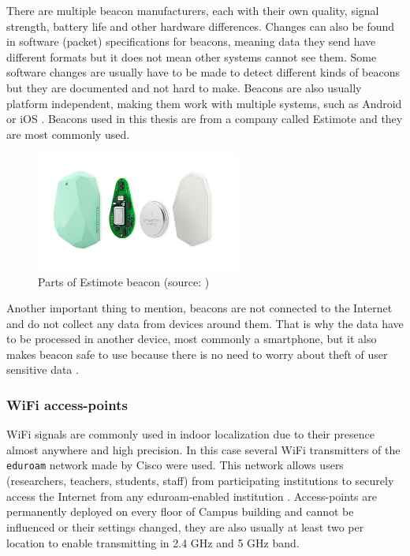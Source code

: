 There are multiple beacon manufacturers, each with their own quality, signal strength, battery life and other hardware differences. Changes can also be found in software (packet) specifications for beacons, meaning data they send have different formats but it does not mean other systems cannot see them. Some software changes are usually have to be made to detect different kinds of beacons but they are documented and not hard to make. Beacons are also usually platform independent, making them work with multiple systems, such as Android or iOS \cite{IPSBOBLE, 10TABB}. Beacons used in this thesis are from a company called Estimote and they are most commonly used.

\begin{figure}[H]
	\begin{centering}
		\includegraphics[width=0.6\textwidth]{img/estimote_beacon}
		\par\end{centering}
	\caption{Parts of Estimote beacon (source: \cite{RMPFEB})\label{fig:PartsOfEstimoteBeacon}}
	\label{fig02c05}
\end{figure}

Another important thing to mention, beacons are not connected to the Internet and do not collect any data from devices around them. That is why the data have to be processed in another device, most commonly a smartphone, but it also makes beacon safe to use because there is no need to worry about theft of user sensitive data \cite{10TABB}.

\subsubsection{WiFi access-points}\label{subsec:WiFiAccessPoints}
WiFi signals are commonly used in indoor localization due to their presence almost anywhere and high precision. In this case several WiFi transmitters of the \verb|eduroam| network made by Cisco were used. This network allows users (researchers, teachers, students, staff) from participating institutions to securely access the Internet from any eduroam-enabled institution \cite{Eduroam}. Access-points are permanently deployed on every floor of Campus building and cannot be influenced or their settings changed, they are also usually at least two per location to enable transmitting in 2.4 GHz and 5 GHz band.

